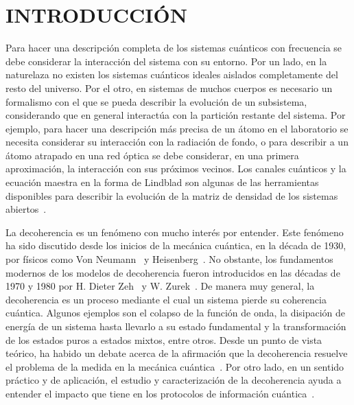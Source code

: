 \chapter{INTRODUCCIÓN}
Para hacer una descripción completa de los sistemas cuánticos 
con frecuencia se debe considerar la interacción del sistema con su entorno. Por un lado, 
en la naturelaza no existen los sistemas cuánticos ideales 
aislados completamente del resto del universo. 
Por el otro, en sistemas de muchos cuerpos es necesario un formalismo
con el que se pueda describir la evolución de un subsistema, considerando
que en general interactúa con la partición restante del sistema.
Por ejemplo, para hacer una descripción más precisa de un átomo en el laboratorio se
necesita considerar su interacción con la radiación de fondo, 
o para describir a un átomo atrapado en una red óptica se debe considerar, 
en una primera aproximación, la interacción con sus próximos vecinos.
Los canales cuánticos y la ecuación maestra en la forma de Lindblad son algunas
de las herramientas disponibles para describir la evolución de la 
matriz de densidad de los sistemas abiertos~\cite{nielsen_chuang_2011}. 

La decoherencia es un fenómeno con mucho interés por entender. 
Este fenómeno ha sido discutido desde los inicios de la mecánica cuántica,
en la década de 1930, por físicos como
Von Neumann~\cite{von2018mathematical} y Heisenberg~\cite{bacciagaluppi2003role}.
No obstante, los fundamentos modernos de los modelos
de decoherencia fueron introducidos en las décadas de 1970 y 1980 
por H. Dieter Zeh~\cite{zeh1970interpretation}  y W. Zurek~\cite{zurek1981pointer}. 
De manera muy general, la decoherencia es un proceso mediante el cual 
un sistema pierde su coherencia cuántica. 
Algunos ejemplos son el colapso de 
la función de onda, la disipación de energía 
de un sistema hasta llevarlo a su estado fundamental y la transformación de los 
estados puros a estados mixtos, entre otros.
Desde un punto de vista teórico, ha habido un debate acerca de la afirmación
que la decoherencia resuelve el problema de la medida en 
la mecánica cuántica~\cite{bacciagaluppi2003role}.
Por otro lado, en un sentido práctico y de aplicación, 
el estudio y caracterización de la decoherencia 
ayuda a entender el impacto que tiene en los protocolos de información 
cuántica~\cite{pepino2011open}. 


